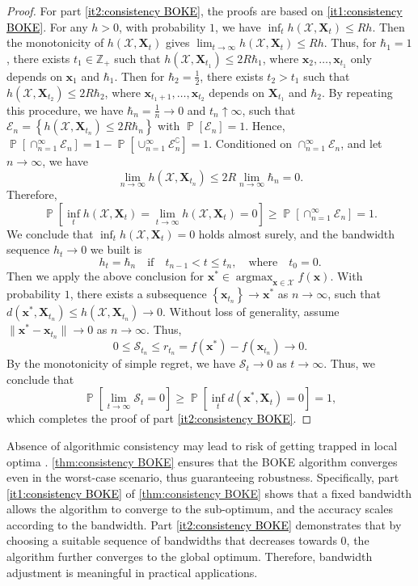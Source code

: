 \documentclass[11pt,en]{elegantpaper}
\newcommand{\domain}{\mathcal{X}}
\newcommand{\X}{\bm{X}}
\newcommand{\x}{\bm{x}}
\newcommand{\simregret}{\mathcal{S}}
\newcommand{\1}{\mathds{1}}
\newcommand{\set}[1]{\left\{#1\right\}}
\DeclareMathOperator*{\Prob}{\mathbb{P}}
\DeclareMathOperator*{\argmax}{argmax}
\newcommand{\itref}[1]{\hyperref[#1]{\textcolor{black}{\ref*{#1}}}}
\begin{document}
\begin{proof}
    For part \itref{it2:consistency BOKE}, the proofs are based on \itref{it1:consistency BOKE}. For any $h > 0$, with probability $1$, we have $\inf_t h(\domain, \X_t) \le R h$. Then the monotonicity of $h(\domain, \X_t)$ gives $\lim_{t \to \infty} h(\domain, \X_t) \le R h$. Thus, for $\hbar_1 = 1$, there exists $t_1 \in \mathbb{Z}_+$ such that $h(\domain, \X_{t_1}) \le 2 R \hbar_1$, where $\x_2, \dots, \x_{t_1}$ only depends on $\x_1$ and $\hbar_1$. Then for $\hbar_2 = \frac{1}{2}$, there exists $t_2 > t_1$ such that $h(\domain, \X_{t_2}) \le 2 R \hbar_2$, where $\x_{t_1 + 1}, \dots, \x_{t_2}$ depends on $\X_{t_1}$ and $\hbar_2$. By repeating this procedure, we have $\hbar_n = \frac{1}{n} \to 0$ and $t_n \uparrow \infty$, such that $\mathcal{E}_n = \set{h(\domain, \X_{t_n}) \le 2 R \hbar_n}$ with $\Prob[\mathcal{E}_n] = 1$. Hence, $\Prob\left[\cap_{n=1}^{\infty} \mathcal{E}_n\right] = 1 - \Prob\left[\cup_{n=1}^{\infty} \mathcal{E}_n^{\complement}\right] = 1$. Conditioned on $\cap_{n=1}^{\infty} \mathcal{E}_n$, and let $n \to \infty$, we have
    \[
        \lim_{n \to \infty} h(\domain, \X_{t_n}) \le 2 R \lim_{n \to \infty} \hbar_n = 0.
    \]
    Therefore,
    \[
        \Prob\left[ \inf_t h(\domain, \X_t) = \lim_{t \to \infty} h(\domain, \X_t) = 0 \right]
        \ge \Prob\left[\cap_{n=1}^{\infty} \mathcal{E}_n\right] = 1.
    \]
    We conclude that $\inf_t h(\domain, \X_t) = 0$ holds almost surely, and the bandwidth sequence $h_t \to 0$ we built is
    \[
        h_t = \hbar_n \quad \text{if} \quad t_{n-1} < t \le t_n, \quad \text{where} \quad t_0 = 0.
    \]
    Then we apply the above conclusion for $\x^{\ast} \in \argmax_{\x \in \domain} f(\x)$. With probability $1$, there exists a subsequence $\set{\x_{t_n}} \to \x^{\ast}$ as $n \to \infty$, such that $d(\x^{\ast}, \X_{t_n}) \le h(\domain, \X_{t_n}) \to 0$. Without loss of generality, assume $\| \x^{\ast} - \x_{t_n} \| \to 0$ as $n \to \infty$. Thus,
    \[
        0 \le \simregret_{t_n} \le r_{t_n} = f(\x^{\ast}) - f(\x_{t_n}) \to 0.
    \]
    By the monotonicity of simple regret, we have $\simregret_t \to 0$ as $t \to \infty$. Thus, we conclude that
    \[
        \Prob\left[ \lim_{t \to \infty} \simregret_t = 0 \right]
        \ge \Prob\left[ \inf_{t} d(\x^{\ast}, \X_t) = 0 \right] = 1,
    \]
    which completes the proof of part \itref{it2:consistency BOKE}.
\end{proof}


Absence of algorithmic consistency may lead to risk of getting trapped in local optima \cite{song2022general}. \cref{thm:consistency BOKE} ensures that the BOKE algorithm converges even in the worst-case scenario, thus guaranteeing robustness. Specifically, part \itref{it1:consistency BOKE} of \cref{thm:consistency BOKE} shows that a fixed bandwidth allows the algorithm to converge to the sub-optimum, and the accuracy scales according to the bandwidth. 
Part \itref{it2:consistency BOKE} demonstrates that by choosing a suitable sequence of bandwidths that decreases towards $0$, the algorithm further converges to the global optimum. Therefore, bandwidth adjustment is meaningful in practical applications.
\end{document}
